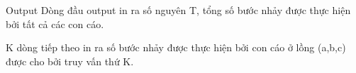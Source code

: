 Output
Dòng đầu output in ra số nguyên T, tổng số bước nhảy được thực hiện bởi tất cả các con cáo.

K dòng tiếp theo in ra số bước nhảy được thực hiện bởi con cáo ở lồng (a,b,c) được cho bởi truy vấn thứ K.